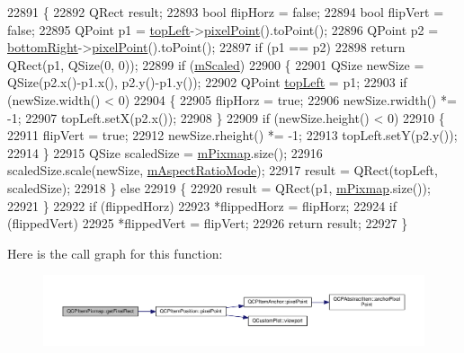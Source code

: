 \begin{DoxyCode}
22891 \{
22892   QRect result;
22893   \textcolor{keywordtype}{bool} flipHorz = \textcolor{keyword}{false};
22894   \textcolor{keywordtype}{bool} flipVert = \textcolor{keyword}{false};
22895   QPoint p1 = \hyperlink{class_q_c_p_item_pixmap_a43c281ef6ad46f3cf04f365289abe51a}{topLeft}->\hyperlink{class_q_c_p_item_position_ae490f9c76ee2ba33752c495d3b6e8fb5}{pixelPoint}().toPoint();
22896   QPoint p2 = \hyperlink{class_q_c_p_item_pixmap_abcc38063f9502b876bf6615c45cc0994}{bottomRight}->\hyperlink{class_q_c_p_item_position_ae490f9c76ee2ba33752c495d3b6e8fb5}{pixelPoint}().toPoint();
22897   \textcolor{keywordflow}{if} (p1 == p2)
22898     \textcolor{keywordflow}{return} QRect(p1, QSize(0, 0));
22899   \textcolor{keywordflow}{if} (\hyperlink{class_q_c_p_item_pixmap_a8fe670a529cd46a9b8afd9fc1203bc3f}{mScaled})
22900   \{
22901     QSize newSize = QSize(p2.x()-p1.x(), p2.y()-p1.y());
22902     QPoint \hyperlink{class_q_c_p_item_pixmap_a43c281ef6ad46f3cf04f365289abe51a}{topLeft} = p1;
22903     \textcolor{keywordflow}{if} (newSize.width() < 0)
22904     \{
22905       flipHorz = \textcolor{keyword}{true};
22906       newSize.rwidth() *= -1;
22907       topLeft.setX(p2.x());
22908     \}
22909     \textcolor{keywordflow}{if} (newSize.height() < 0)
22910     \{
22911       flipVert = \textcolor{keyword}{true};
22912       newSize.rheight() *= -1;
22913       topLeft.setY(p2.y());
22914     \}
22915     QSize scaledSize = \hyperlink{class_q_c_p_item_pixmap_a1396cce7f26c7b8e9512906284380c4d}{mPixmap}.size();
22916     scaledSize.scale(newSize, \hyperlink{class_q_c_p_item_pixmap_a8dc6b6c1e106ac523efae22d5fe55bab}{mAspectRatioMode});
22917     result = QRect(topLeft, scaledSize);
22918   \} \textcolor{keywordflow}{else}
22919   \{
22920     result = QRect(p1, \hyperlink{class_q_c_p_item_pixmap_a1396cce7f26c7b8e9512906284380c4d}{mPixmap}.size());
22921   \}
22922   \textcolor{keywordflow}{if} (flippedHorz)
22923     *flippedHorz = flipHorz;
22924   \textcolor{keywordflow}{if} (flippedVert)
22925     *flippedVert = flipVert;
22926   \textcolor{keywordflow}{return} result;
22927 \}
\end{DoxyCode}


Here is the call graph for this function\+:\nopagebreak
\begin{figure}[H]
\begin{center}
\leavevmode
\includegraphics[width=350pt]{class_q_c_p_item_pixmap_a245ef0c626cab7096a810442f2f6a2d9_cgraph}
\end{center}
\end{figure}




